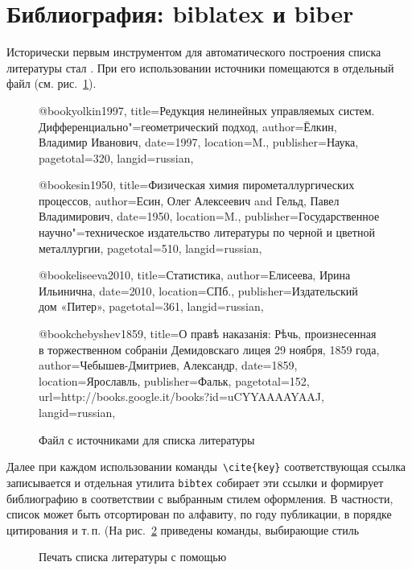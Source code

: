 \documentclass[a4paper,12pt,hyphens]{article}
\newcommand\package[1]{\texttt{#1}}
\DeclareRobustCommand{\myBibTeX}{\BibTeX}
\begin{document}
\section{Библиография: biblatex и biber}
Исторически первым инструментом для автоматического построения
списка литературы стал \BibTeX \parencite{ctan-bibtex}. При его
использовании источники
помещаются в отдельный файл (см. рис.~\ref{bibfile}).
\begin{figure}[tp]
\begin{bibtexcode}
@book{yolkin1997,
  title={Редукция нелинейных управляемых систем.
         Дифференциально"=геометрический подход},
  author={Ёлкин, Владимир Иванович},
  date={1997},
  location={M.},
  publisher={Наука},
  pagetotal={320},
  langid={russian},
}

@book{esin1950,
  title={Физическая химия пирометаллургических процессов},
  author={Есин, Олег Алексеевич and Гельд, Павел Владимирович},
  date={1950},
  location={M.},
  publisher={Государственное научно"=техническое издательство
             литературы по черной и цветной металлургии},
  pagetotal={510},
  langid={russian},
}

@book{eliseeva2010,
  title={Статистика},
  author={Елисеева, Ирина Ильинична},
  date={2010},
  location={СПб.},
  publisher={Издательский дом «Питер»},
  pagetotal={361},
  langid={russian},
}

@book{chebyshev1859,
  title={О правѣ наказанія: Рѣчь, произнесенная в торжественном
         собраніи Демидовскаго лицея 29 ноября, 1859 года},
  author={Чебышев-Дмитриев, Александр},
  date={1859},
  location={Ярославль},
  publisher={Фальк},
  pagetotal={152},
  url={http://books.google.it/books?id=uCYYAAAAYAAJ},
  langid={russian},
}
\end{bibtexcode}
\caption{Файл с источниками для списка литературы}\label{bibfile}
\end{figure}
Далее при каждом использовании команды~\verb|\cite{key}| соответствующая
ссылка записывается и отдельная утилита \package{bibtex} собирает эти
ссылки и формирует библиографию в соответствии с выбранным стилем оформления.
В частности, список может быть отсортирован по алфавиту, по году
публикации, в порядке цитирования и т.\,п.
(На рис.~\ref{bibliography} приведены команды, выбирающие стиль
\begin{figure}[tp]
\begin{latexcode}


\end{latexcode}
\caption{Печать списка литературы с помощью \myBibTeX}\label{bibliography}
\end{figure}
\end{document}
